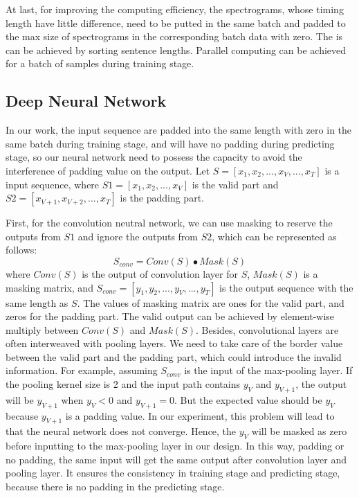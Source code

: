 \documentclass[a4paper]{article}
\begin{document}
At last, for improving the computing efficiency, the spectrograms, whose timing length have little difference, need to be putted in the same batch and padded to the max size of spectrograms in the corresponding batch data with zero. The is can be achieved by sorting sentence lengths. Parallel computing can be achieved for a batch of samples during training stage.

\subsection{Deep Neural Network}
\label{ssec:deep_neural_network}

In our work, the input sequence are padded into the same length with zero in the same batch during training stage, and will have no padding during predicting stage, so our neural network need to possess the capacity to avoid the interference of padding value on the output.  Let $S=[x_1, x_2, ..., x_V, ..., x_T]$ is a input sequence, where $S1=[x_1, x_2, ..., x_V]$ is the valid part and $S2=[x_{V+1}, x_{V+2}, ..., x_T]$ is the padding part.

First, for the convolution neutral network, we can use masking to reserve the outputs from $S1$ and ignore the outputs from $S2$, which can be represented as follows:
\begin{equation}
\label{eq:masking}
S_{conv}=Conv(S) \bullet Mask(S)
\end{equation}
where $Conv(S)$ is the output of convolution layer for $S$, $Mask(S)$ is a masking matrix, and $S_{conv}=[y_1, y_2, ..., y_V, ..., y_T]$ is the output sequence with the same length as $S$. The values of masking matrix are ones for the valid part, and zeros for the padding part. The valid output can be achieved by element-wise multiply between $Conv(S)$ and $Mask(S)$. Besides, convolutional layers are often interweaved with pooling layers. We need to take care of the border value between the valid part and the padding part, which could introduce the invalid information. For example, assuming $S_{conv}$ is the input of the max-pooling layer. If the pooling kernel size is 2 and the input path contains $y_V$ and $y_{V+1}$, the output will be $y_{V+1}$ when $y_V<0$ and $y_{V+1}=0$. But the expected value should be $y_V$ because $y_{V+1}$ is a padding value. In our experiment, this problem will lead to that the neural network does not converge. Hence, the $y_V$ will be masked as zero before inputting to the max-pooling layer in our design. In this way, padding or no padding, the same input will get the same output after convolution layer and pooling layer. It ensures the consistency in training stage and predicting stage, because there is no padding in the predicting stage.
\end{document}

